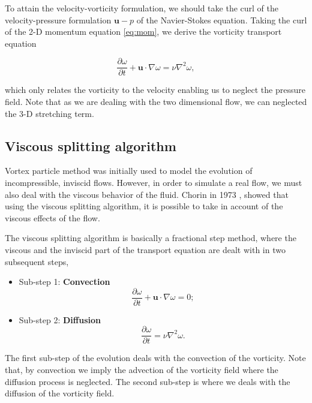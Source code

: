 To attain the velocity-vorticity formulation, we should take the curl of the velocity-pressure formulation $\mathbf{u}-p$ of the Navier-Stokes equation. Taking the curl of the 2-D momentum equation \ref{eq:mom}, we derive the vorticity transport equation

	\begin{equation}
	\frac{\partial \omega}{\partial t} + \mathbf{u}\cdot\nabla\omega = \nu \nabla^2 \omega,
	\end{equation}

which only relates the vorticity to the velocity enabling us to neglect the pressure field. Note that as we are dealing with the two dimensional flow, we can neglected the 3-D stretching term. 


\subsection{Viscous splitting algorithm}
Vortex particle method was initially used to model the evolution of incompressible, inviscid flows. However, in order to simulate a real flow, we must also deal with the viscous behavior of the fluid. Chorin in 1973 \cite{Chorin1973}, showed that using the viscous splitting algorithm, it is possible to take in account of the viscous effects of the flow. 

The viscous splitting algorithm is basically a fractional step method, where the viscous and the inviscid part of the transport equation are dealt with in two subsequent steps, 

	\begin{itemize}
	\item Sub-step 1: \textbf{Convection}
		\begin{equation}
		\frac{\partial\omega}{\partial t} + \mathbf{u}\cdot\nabla\omega=0;
		\label{eq:convectionEulerian}
		\end{equation}
		
	\item Sub-step 2: \textbf{Diffusion}
		\begin{equation}
		\frac{\partial\omega}{\partial t} = \nu\nabla^2\omega.
		\label{eq:vsa2}
		\end{equation}
	
	\end{itemize}

The first sub-step of the evolution deals with the convection of the vorticity. Note that, by convection we imply the advection of the vorticity field where the diffusion process is neglected. The second sub-step is where we deals with the diffusion of the vorticity field. 

